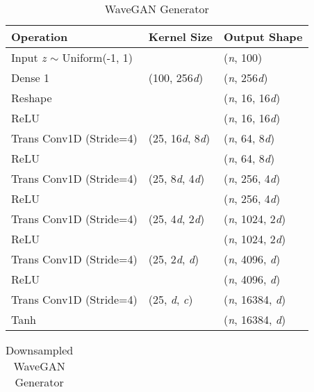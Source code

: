 \documentclass[a4paper, dvipsnames, titlepage]{article}
\begin{document}
\begin{appendices}
  \begin{table}[h]
    
    \caption{WaveGAN Generator}
    \label{tab:Gen}
    
    \begin{center}
      \begin{tabular}{ l | l | l}
        
        Operation & Kernel Size & Output Shape \\
        \hline
        Input {\it z} $\sim$ Uniform(-1, 1) & & ({\it n}, 100) \\
        Dense 1 & (100, 256{\it d}) & ({\it n}, 256{\it d}) \\
        Reshape & & ({\it n}, 16, 16{\it d}) \\
        ReLU & & ({\it n}, 16, 16{\it d}) \\
        Trans Conv1D (Stride=4) & (25, 16{\it d}, 8{\it d}) & ({\it n}, 64, 8{\it d}) \\
        ReLU & & ({\it n}, 64, 8{\it d}) \\
        Trans Conv1D (Stride=4) & (25, 8{\it d}, 4{\it d}) & ({\it n}, 256, 4{\it d}) \\
        ReLU & & ({\it n}, 256, 4{\it d}) \\
        Trans Conv1D (Stride=4) & (25, 4{\it d}, 2{\it d}) & ({\it n}, 1024, 2{\it d}) \\
        ReLU & & ({\it n}, 1024, 2{\it d}) \\
        Trans Conv1D (Stride=4) & (25, 2{\it d}, {\it d}) & ({\it n}, 4096, {\it d}) \\
        ReLU & & ({\it n}, 4096, {\it d}) \\
        Trans Conv1D (Stride=4) & (25, {\it d}, {\it c}) & ({\it n}, 16384, {\it d}) \\
        Tanh & & ({\it n}, 16384, {\it d}) \\

      \end{tabular}
    \end{center}
    
  \end{table}

  \begin{table}[h]
    
    \caption{Downsampled WaveGAN Generator}
    \label{tab:GenDown}
    
    \begin{center}
      \begin{tabular}{ l | l | l}
        

\end{tabular}
\end{center}
\end{table}
\end{appendices}
\end{document}
